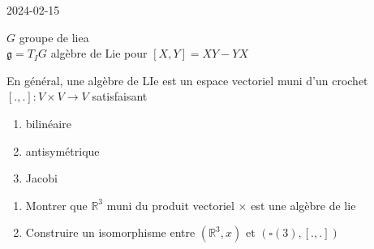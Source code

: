 


2024-02-15

\begin{tcolorbox}[title=Rappels]
	\(G\) groupe de liea\\
	\(\mathfrak{g} = T_I G\) algèbre de Lie pour \( [X, Y] = XY - YX\)

	En général, une algèbre de LIe est un espace vectoriel muni d'un crochet \( [., .]: V \times V \to V\) satisfaisant

\begin{enumerate}
	\item bilinéaire
	\item antisymétrique
	\item Jacobi
\end{enumerate}
\end{tcolorbox}

\begin{tcolorbox}[title=Exercice, colframe=green]
	\begin{enumerate}
		\item Montrer que \(\mathds{R}^{3}\) muni du produit vectoriel \(\times \) est une algèbre de lie
		\item Construire un isomorphisme entre \( \left( \mathds{R}^{3}, x \right) \text{ et } \left( \square(3), [., .]  \right)    \)	
	\end{enumerate} 
\end{tcolorbox}


